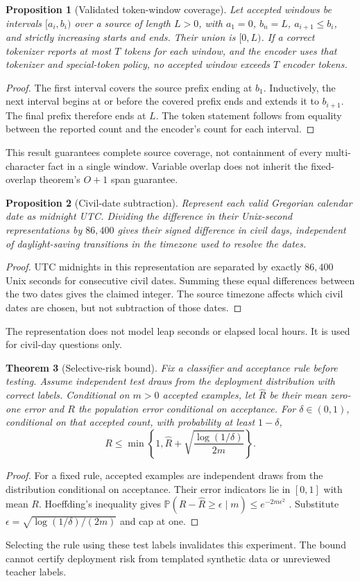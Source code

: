 \documentclass[11pt]{article}
\newtheorem{theorem}{Theorem}
\newtheorem{proposition}[theorem]{Proposition}
\newcommand{\Prob}{\mathbb{P}}
\begin{document}
\begin{proposition}[Validated token-window coverage]
Let accepted windows be intervals $[a_i,b_i)$ over a source of length $L>0$, with $a_1=0$, $b_n=L$, $a_{i+1}\leq b_i$, and strictly increasing starts and ends. Their union is $[0,L)$. If a correct tokenizer reports at most $T$ tokens for each window, and the encoder uses that tokenizer and special-token policy, no accepted window exceeds $T$ encoder tokens.
\end{proposition}
\begin{proof}
The first interval covers the source prefix ending at $b_1$. Inductively, the next interval begins at or before the covered prefix ends and extends it to $b_{i+1}$. The final prefix therefore ends at $L$. The token statement follows from equality between the reported count and the encoder's count for each interval.
\end{proof}
This result guarantees complete source coverage, not containment of every multi-character fact in a single window. Variable overlap does not inherit the fixed-overlap theorem's $O+1$ span guarantee.

\begin{proposition}[Civil-date subtraction]
Represent each valid Gregorian calendar date as midnight UTC. Dividing the difference in their Unix-second representations by $86{,}400$ gives their signed difference in civil days, independent of daylight-saving transitions in the timezone used to resolve the dates.
\end{proposition}
\begin{proof}
UTC midnights in this representation are separated by exactly $86{,}400$ Unix seconds for consecutive civil dates. Summing these equal differences between the two dates gives the claimed integer. The source timezone affects which civil dates are chosen, but not subtraction of those dates.
\end{proof}
The representation does not model leap seconds or elapsed local hours. It is used for civil-day questions only.

\begin{theorem}[Selective-risk bound]
Fix a classifier and acceptance rule before testing. Assume independent test draws from the deployment distribution with correct labels. Conditional on $m>0$ accepted examples, let $\widehat R$ be their mean zero-one error and $R$ the population error conditional on acceptance. For $\delta\in(0,1)$, conditional on that accepted count, with probability at least $1-\delta$,
\[
 R\leq\min\left\{1,\widehat R+
 \sqrt{\frac{\log(1/\delta)}{2m}}\right\}.
\]
\end{theorem}
\begin{proof}
For a fixed rule, accepted examples are independent draws from the distribution conditional on acceptance. Their error indicators lie in $[0,1]$ with mean $R$. Hoeffding's inequality gives
$\Prob(R-\widehat R\geq\epsilon\mid m)\leq e^{-2m\epsilon^2}$ \citep{hoeffding}.
Substitute $\epsilon=\sqrt{\log(1/\delta)/(2m)}$ and cap at one.
\end{proof}
Selecting the rule using these test labels invalidates this experiment. The bound cannot certify deployment risk from templated synthetic data or unreviewed teacher labels.
\end{document}
